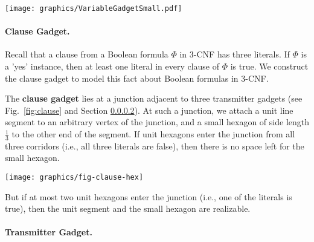 \begin{minipage}{\linewidth}
\begin{center}
\texttt{[image: graphics/VariableGadgetSmall.pdf]}
\label{fig:VariableGadgetSmall.pdf}
\end{center}
\end{minipage}



\paragraph{Clause Gadget.}
Recall that a clause from a Boolean formula $\Phi$ in 3-CNF has three literals.  If $\Phi$ is a  'yes' instance, then at least one literal in every clause of $\Phi$ is true.  We construct the clause gadget to model this fact about Boolean formulas in 3-CNF.

The {\bf clause gadget} lies at a junction adjacent to three transmitter gadgets (see Fig.~\ref{fig:clause} and Section \ref{transmitterGadget}). 
At such a junction, we attach a unit line segment to an arbitrary vertex of the junction, and a small hexagon of side length $\frac{1}{3}$ to the other end of the segment. 
If unit hexagons enter the junction from all three corridors (i.e., all three literals are false), then there is no space left for the small hexagon. 

\begin{minipage}{\linewidth}
\begin{center}
\texttt{[image: graphics/fig-clause-hex]}
\label{fig:clause}
\end{center}
\end{minipage}

But if at most two unit hexagons enter the junction (i.e., one of the literals is true), then the unit segment and the small hexagon are realizable.

\paragraph{Transmitter Gadget.}\label{transmitterGadget}

